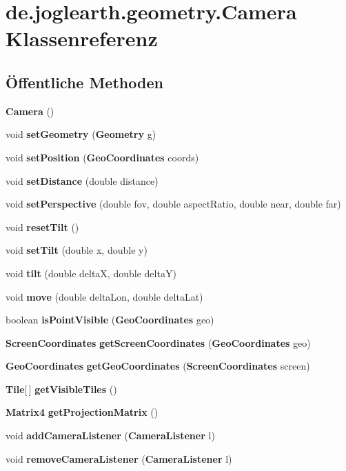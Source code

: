 \section{de.\-joglearth.\-geometry.\-Camera Klassenreferenz}
\label{classde_1_1joglearth_1_1geometry_1_1_camera}
\subsection*{Öffentliche Methoden}
\begin{DoxyCompactItemize}
\item 
{\bf Camera} ()
\item 
void {\bf set\-Geometry} ({\bf Geometry} g)
\item 
void {\bf set\-Position} ({\bf Geo\-Coordinates} coords)
\item 
void {\bf set\-Distance} (double distance)
\item 
void {\bf set\-Perspective} (double fov, double aspect\-Ratio, double near, double far)
\item 
void {\bf reset\-Tilt} ()
\item 
void {\bf set\-Tilt} (double x, double y)
\item 
void {\bf tilt} (double delta\-X, double delta\-Y)
\item 
void {\bf move} (double delta\-Lon, double delta\-Lat)
\item 
boolean {\bf is\-Point\-Visible} ({\bf Geo\-Coordinates} geo)
\item 
{\bf Screen\-Coordinates} {\bf get\-Screen\-Coordinates} ({\bf Geo\-Coordinates} geo)
\item 
{\bf Geo\-Coordinates} {\bf get\-Geo\-Coordinates} ({\bf Screen\-Coordinates} screen)
\item 
{\bf Tile}[$\,$] {\bf get\-Visible\-Tiles} ()
\item 
{\bf Matrix4} {\bf get\-Projection\-Matrix} ()
\item 
void {\bfseries add\-Camera\-Listener} ({\bf Camera\-Listener} l)\label{classde_1_1joglearth_1_1geometry_1_1_camera_a2f06e1d4b555f4d96f1016e5611568ea}

\item 
void {\bfseries remove\-Camera\-Listener} ({\bf Camera\-Listener} l)\label{classde_1_1joglearth_1_1geometry_1_1_camera_a961ca081f11f43f651e6691c953efb79}

\end{DoxyCompactItemize}


